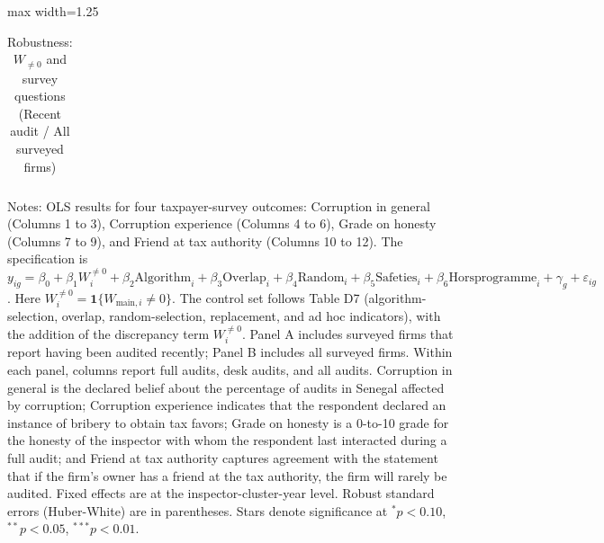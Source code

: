 \documentclass{article}
\newcommand{\OutPath}{Output/}%
\newcommand{\OutPath}{../Output/}%
\begin{document}
\begin{landscape}
\begin{table}[!htbp]
\centering
\begin{adjustbox}{max width=1.25\textwidth}
\begin{threeparttable}
\caption{Robustness: \(W_{\neq 0}\) and survey questions (Recent audit / All surveyed firms)}
\begin{tabular}{l*{12}{c}}

\end{tabular}
\begin{tablenotes}[flushleft]
\footnotesize
\item Notes: OLS results for four taxpayer-survey outcomes: Corruption in general (Columns 1 to 3), Corruption experience (Columns 4 to 6), Grade on honesty (Columns 7 to 9), and Friend at tax authority (Columns 10 to 12). The specification is \(y_{ig}=\beta_0+\beta_1 W_i^{\neq 0}+\beta_2 \text{Algorithm}_i+\beta_3 \text{Overlap}_i+\beta_4 \text{Random}_i+\beta_5 \text{Safeties}_i+\beta_6 \text{Horsprogramme}_i+\gamma_g+\varepsilon_{ig}\). Here \(W_i^{\neq 0}=\mathbf{1}\{W_{\text{main},i}\neq 0\}\). The control set follows Table D7 (algorithm-selection, overlap, random-selection, replacement, and ad hoc indicators), with the addition of the discrepancy term \(W_i^{\neq 0}\). Panel A includes surveyed firms that report having been audited recently; Panel B includes all surveyed firms. Within each panel, columns report full audits, desk audits, and all audits. Corruption in general is the declared belief about the percentage of audits in Senegal affected by corruption; Corruption experience indicates that the respondent declared an instance of bribery to obtain tax favors; Grade on honesty is a 0-to-10 grade for the honesty of the inspector with whom the respondent last interacted during a full audit; and Friend at tax authority captures agreement with the statement that if the firm's owner has a friend at the tax authority, the firm will rarely be audited. Fixed effects are at the inspector-cluster-year level. Robust standard errors (Huber-White) are in parentheses. Stars denote significance at \(^{*}p<0.10\), \(^{**}p<0.05\), \(^{***}p<0.01\).
\end{tablenotes}
\end{threeparttable}
\end{adjustbox}
\end{table}
\end{landscape}
\end{document}
